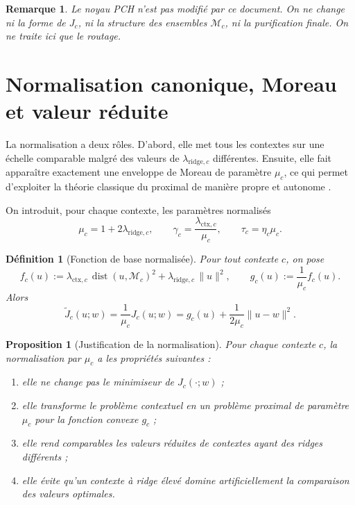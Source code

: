 \documentclass[11pt,a4paper]{article}
\newtheorem{definition}{Définition}[section]
\newtheorem{proposition}{Proposition}[section]
\newtheorem{remark}{Remarque}[section]
\DeclareMathOperator{\dist}{dist}
\newcommand{\Mcal}{\mathcal M}
\begin{document}
\begin{remark}
Le noyau PCH n'est pas modifié par ce document. On ne change ni la forme de \(J_c\), ni la structure des ensembles \(\Mcal_c\), ni la purification finale. On ne traite ici que le routage.
\end{remark}

\section{Normalisation canonique, Moreau et valeur réduite}

La normalisation a deux rôles. D'abord, elle met tous les contextes sur une échelle comparable malgré des valeurs de \(\lambda_{\mathrm{ridge},c}\) différentes. Ensuite, elle fait apparaître exactement une enveloppe de Moreau de paramètre \(\mu_c\), ce qui permet d'exploiter la théorie classique du proximal de manière propre et autonome \cite{Moreau1965,Rockafellar1970,BauschkeCombettes2017}.

On introduit, pour chaque contexte, les paramètres normalisés
\[
\mu_c = 1 + 2\lambda_{\mathrm{ridge},c},
\qquad
\gamma_c = \frac{\lambda_{\mathrm{ctx},c}}{\mu_c},
\qquad
\tau_c = \eta_c \mu_c.
\]

\begin{definition}[Fonction de base normalisée]
Pour tout contexte \(c\), on pose
\[
f_c(u):=\lambda_{\mathrm{ctx},c}\,\dist(u,\Mcal_c)^2+\lambda_{\mathrm{ridge},c}\,\|u\|^2,
\qquad
g_c(u):=\frac{1}{\mu_c}f_c(u).
\]
Alors
\[
\widetilde J_c(u;w)=\frac{1}{\mu_c}J_c(u;w)
=
 g_c(u)+\frac{1}{2\mu_c}\|u-w\|^2.
\]
\end{definition}

\begin{proposition}[Justification de la normalisation]
Pour chaque contexte \(c\), la normalisation par \(\mu_c\) a les propriétés suivantes :
\begin{enumerate}[leftmargin=2em]
\item elle ne change pas le minimiseur de \(J_c(\cdot;w)\) ;
\item elle transforme le problème contextuel en un problème proximal de paramètre \(\mu_c\) pour la fonction convexe \(g_c\) ;
\item elle rend comparables les valeurs réduites de contextes ayant des ridges différents ;
\item elle évite qu'un contexte à ridge élevé domine artificiellement la comparaison des valeurs optimales.
\end{enumerate}
\end{proposition}
\end{document}
